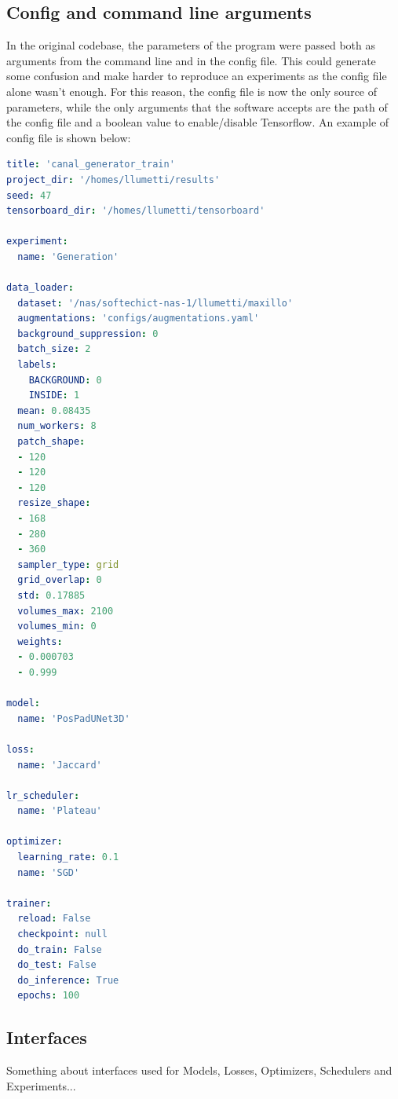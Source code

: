 \subsection{Config and command line arguments}
In the original codebase, the parameters of the program were passed both as
arguments from the command line and in the config file. This could generate some
confusion and make harder to reproduce an experiments as the config file alone
wasn't enough. For this reason, the config file is now the only source of
parameters, while the only arguments that the software accepts are the path of the
config file and a boolean value to enable/disable Tensorflow.
An example of config file is shown below:

\begin{lstlisting}[language=YAML,breaklines=true,caption=Example of config file., label=union]
title: 'canal_generator_train'
project_dir: '/homes/llumetti/results'
seed: 47
tensorboard_dir: '/homes/llumetti/tensorboard'

experiment:
  name: 'Generation'

data_loader:
  dataset: '/nas/softechict-nas-1/llumetti/maxillo'
  augmentations: 'configs/augmentations.yaml'
  background_suppression: 0
  batch_size: 2
  labels:
    BACKGROUND: 0
    INSIDE: 1
  mean: 0.08435
  num_workers: 8
  patch_shape:
  - 120
  - 120
  - 120
  resize_shape:
  - 168
  - 280
  - 360
  sampler_type: grid
  grid_overlap: 0
  std: 0.17885
  volumes_max: 2100
  volumes_min: 0
  weights:
  - 0.000703
  - 0.999

model:
  name: 'PosPadUNet3D'

loss:
  name: 'Jaccard'

lr_scheduler:
  name: 'Plateau'

optimizer:
  learning_rate: 0.1
  name: 'SGD'

trainer:
  reload: False
  checkpoint: null
  do_train: False
  do_test: False
  do_inference: True
  epochs: 100
\end{lstlisting}

\subsection{Interfaces}
Something about interfaces used for Models, Losses, Optimizers, Schedulers and
Experiments...

